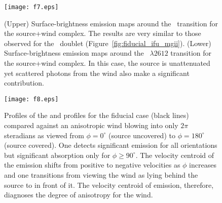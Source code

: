 \documentclass[12pt,preprint]{aastex}
\begin{document}
\begin{figure}
\texttt{[image: f7.eps]}
\caption{
(Upper) Surface-brightness emission maps around the \feiib\ transition for the
source+wind complex.  
The results are very similar to those observed for the \mgiid\ doublet
(Figure~\ref{fig:fiducial_ifu_mgii}).
(Lower) Surface-brightness emission maps around the ~$\lambda
2612$ transition for the 
source+wind complex.  %
In this case, the source is unattenuated yet scattered photons from
the wind also make a significant contribution. 
}
\label{fig:fiducial_ifu_feii}
\end{figure}


\begin{figure}
\texttt{[image: f8.eps]}
\caption{
Profiles of the  and  profiles for the fiducial
case (black lines) compared against an anisotropic wind blowing into
only $2\pi$ steradians as viewed from $\phi = 0^\circ$ (source
uncovered) to $\phi = 180^\circ$ (source covered).  One detects
significant emission for all orientations but significant
absorption only for $\phi \ge 90^\circ$.
The velocity centroid of the 
emission shifts from positive to negative velocities as $\phi$
increases and one transitions from viewing the wind as lying behind the
source to in front of it.  The velocity centroid of emission, therefore,
diagnoses the degree of anisotropy for the wind.
}
\label{fig:anisotropic}
\end{figure}
\end{document}
